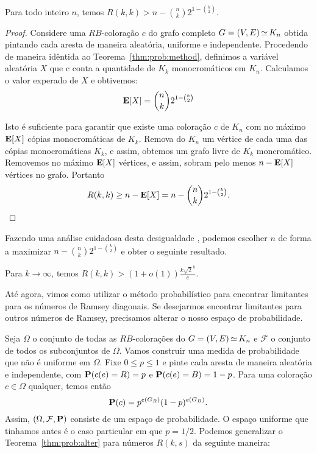\begin{theorem}
\label{thm:prob:alter}
Para todo inteiro $n$, temos $\displaystyle R(k,k) > n - \binom{n}{k}2^{1 - \binom{k}{2}}$.
\end{theorem}
\begin{proof}
Considere uma $RB$-coloração $c$ do grafo completo $G = (V,E) \operatorname{\simeq} K_n$ obtida pintando cada aresta de maneira aleatória, uniforme e independente. Procedendo de maneira idêntida ao Teorema~\ref{thm:prob:method}, definimos a variável aleatória $X$ que c conta a quantidade de $K_k$ monocromáticos em $K_n$. Calculamos o valor experado de $X$ e obtivemos:
\[ \operatorname{\mathbf{E}}[X] = \binom{n}{k} 2^{1 - \binom{k}{2}} \]

Isto é suficiente para garantir que existe uma coloração $c$ de $K_n$ com no máximo $\operatorname{\mathbf{E}}[X]$ cópias monocromáticas de $K_k$. Remova do $K_n$ um vértice de cada uma das cópias monocromáticas $K_k$, e assim, obtemos um grafo livre de $K_k$ moncromático. Removemos no máximo $\operatorname{\mathbf{E}}[X]$ vértices, e assim, sobram pelo menos $n - \operatorname{\mathbf{E}}[X]$ vértices no grafo. Portanto
\[ R(k,k) \geq n - \operatorname{\mathbf{E}}[X] = n - \binom{n}{k} 2^{1 - \binom{k}{2}}.  \qedhere\]
\end{proof}

Fazendo uma análise cuidadosa desta desigualdade \cite{spencer2014asymptopia}, podemos escolher $n$ de forma a maximizar $n - \binom{n}{k}2^{1 - \binom{k}{2}}$ e obter o seguinte resultado.

\begin{corollary}
Para $k \to \infty$, temos $\displaystyle R(k,k) > (1+o(1))\frac{k\sqrt{2}^k}{e}$.
\end{corollary}

Até agora, vimos como utilizar o método probabilístico para encontrar limitantes para os números de Ramsey diagonais. Se desejarmos encontrar limitantes para outros números de Ramsey, precisamos alterar o nosso espaço de probabilidade.

Seja $\Omega$ o conjunto de todas as $RB$-colorações do $G = (V,E) \operatorname{\simeq} K_n$ e $\mathcal{F}$ o conjunto de todos os subconjuntos de $\Omega$. Vamos construir uma medida de probabilidade que não é uniforme em $\Omega$. Fixe $0 \leq p \leq 1$ e pinte cada aresta de maneira aleatória e independente, com $\operatorname{\mathbf{P}}(c(e) = R) = p$ e $\operatorname{\mathbf{P}}(c(e) = B) = 1 - p$. Para uma coloração $c \in \Omega$ qualquer, temos então
\[ \operatorname{\mathbf{P}}(c) =  p^{e(G_R)}(1-p)^{e(G_B)}.\]
Assim, $(\Omega, \mathcal{F}, \operatorname{\mathbf{P}})$ consiste de um espaço de probabilidade. O espaço uniforme que tinhamos antes é o caso particular em que $p = 1/2$. Podemos generalizar o Teorema~\ref{thm:prob:alter} para números $R(k,s)$ da seguinte maneira:

